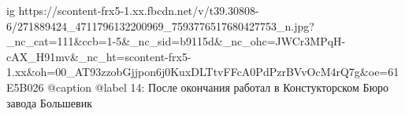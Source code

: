  
 
 
 
 

\ifcmt
  ig https://scontent-frx5-1.xx.fbcdn.net/v/t39.30808-6/271889424_4711796132200969_7593776517680427753_n.jpg?_nc_cat=111&ccb=1-5&_nc_sid=b9115d&_nc_ohc=JWCr3MPqH-cAX_H91mv&_nc_ht=scontent-frx5-1.xx&oh=00_AT93zzobGjjpon6j0KuxDLTtvFFcA0PdPzrBVvOcM4rQ7g&oe=61E5B026
  @caption @label 14: После окончания работал в Констукторском Бюро завода Большевик
\fi
